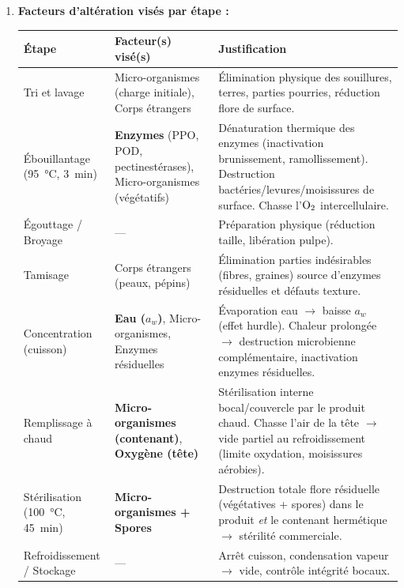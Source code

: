 \documentclass[11pt]{article}
\begin{document}
\begin{corrige}
\begin{enumerate}
\item \textbf{Facteurs d'altération visés par étape :}
\begin{center}
\begin{tabularx}{\linewidth}{|l|X|X|}\hline
\rowcolor{popblueL} \textbf{Étape} & \textbf{Facteur(s) visé(s)} & \textbf{Justification} \\ \hline
Tri et lavage & Micro-organismes (charge initiale), Corps étrangers & Élimination physique des souillures, terres, parties pourries, réduction flore de surface. \\ \hline
Ébouillantage (\SI{95}{\degreeCelsius}, \SI{3}{\minute}) & \textbf{Enzymes} (PPO, POD, pectinestérases), Micro-organismes (végétatifs) & Dénaturation thermique des enzymes (inactivation brunissement, ramollissement). Destruction bactéries/levures/moisissures de surface. Chasse l'$\ce{O2}$ intercellulaire. \\ \hline
Égouttage / Broyage & --- & Préparation physique (réduction taille, libération pulpe). \\ \hline
Tamisage & Corps étrangers (peaux, pépins) & Élimination parties indésirables (fibres, graines) source d'enzymes résiduelles et défauts texture. \\ \hline
Concentration (cuisson) & \textbf{Eau ($a_w$)}, Micro-organismes, Enzymes résiduelles & Évaporation eau $\to$ baisse $a_w$ (effet hurdle). Chaleur prolongée $\to$ destruction microbienne complémentaire, inactivation enzymes résiduelles. \\ \hline
Remplissage à chaud & \textbf{Micro-organismes (contenant)}, \textbf{Oxygène (tête)} & Stérilisation interne bocal/couvercle par le produit chaud. Chasse l'air de la tête $\to$ vide partiel au refroidissement (limite oxydation, moisissures aérobies). \\ \hline
Stérilisation (\SI{100}{\degreeCelsius}, \SI{45}{\minute}) & \textbf{Micro-organismes + Spores} & Destruction totale flore résiduelle (végétatives + spores) dans le produit \emph{et} le contenant hermétique $\to$ stérilité commerciale. \\ \hline
Refroidissement / Stockage & --- & Arrêt cuisson, condensation vapeur $\to$ vide, contrôle intégrité bocaux. \\ \hline
\end{tabularx}
\end{center}


\end{enumerate}
\end{corrige}
\end{document}
